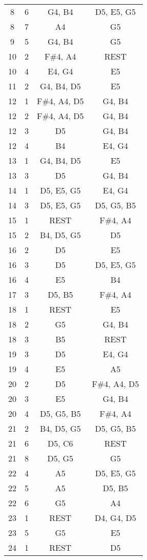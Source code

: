 \documentclass{article}
\begin{document}
\begin{longtable}{|c|c|c|c|}
8 & 6 & G4, B4 & D5, E5, G5 \\ 
8 & 7 & A4 & G5 \\ 
\hline
9 & 5 & G4, B4 & G5 \\ 
\hline
10 & 2 & F\#4, A4 & REST \\ 
10 & 4 & E4, G4 & E5 \\ 
\hline
11 & 2 & G4, B4, D5 & E5 \\ 
\hline
12 & 1 & F\#4, A4, D5 & G4, B4 \\ 
12 & 2 & F\#4, A4, D5 & G4, B4 \\ 
12 & 3 & D5 & G4, B4 \\ 
12 & 4 & B4 & E4, G4 \\ 
\hline
13 & 1 & G4, B4, D5 & E5 \\ 
13 & 3 & D5 & G4, B4 \\ 
\hline
14 & 1 & D5, E5, G5 & E4, G4 \\ 
14 & 3 & D5, E5, G5 & D5, G5, B5 \\ 
\hline
15 & 1 & REST & F\#4, A4 \\ 
15 & 2 & B4, D5, G5 & D5 \\ 
\hline
16 & 2 & D5 & E5 \\ 
16 & 3 & D5 & D5, E5, G5 \\ 
16 & 4 & E5 & B4 \\ 
\hline
17 & 3 & D5, B5 & F\#4, A4 \\ 
\hline
18 & 1 & REST & E5 \\ 
18 & 2 & G5 & G4, B4 \\ 
18 & 3 & B5 & REST \\ 
\hline
19 & 3 & D5 & E4, G4 \\ 
19 & 4 & E5 & A5 \\ 
\hline
20 & 2 & D5 & F\#4, A4, D5 \\ 
20 & 3 & E5 & G4, B4 \\ 
20 & 4 & D5, G5, B5 & F\#4, A4 \\ 
\hline
21 & 2 & B4, D5, G5 & D5, G5, B5 \\ 
21 & 6 & D5, C6 & REST \\ 
21 & 8 & D5, G5 & G5 \\ 
\hline
22 & 4 & A5 & D5, E5, G5 \\ 
22 & 5 & A5 & D5, B5 \\ 
22 & 6 & G5 & A4 \\ 
\hline
23 & 1 & REST & D4, G4, D5 \\ 
23 & 5 & G5 & E5 \\ 
\hline
24 & 1 & REST & D5 \\ 

\end{longtable}
\end{document}
